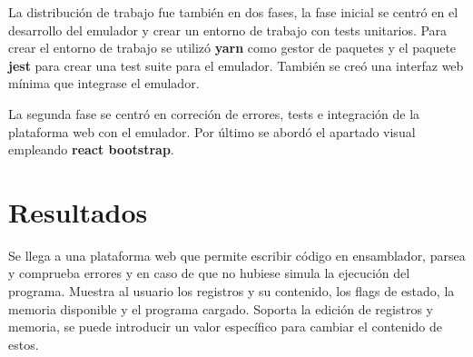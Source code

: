 {    La distribución de trabajo fue también en dos fases, la fase inicial se centró en el desarrollo del emulador y crear un entorno de trabajo con tests unitarios.
    Para crear el entorno de trabajo se utilizó \textbf{yarn} como gestor de paquetes y el paquete \textbf{jest} para crear una test suite para el emulador.
    También se creó una interfaz web mínima que integrase el emulador.

    La segunda fase se centró en correción de errores, tests e integración de la plataforma web con el emulador. 
    Por último se abordó el apartado visual empleando \textbf{react bootstrap}.
}

\section{Resultados}
    Se llega a una plataforma web que permite escribir código en ensamblador, parsea y comprueba errores y en caso de que no hubiese simula la ejecución del programa.
    Muestra al usuario los registros y su contenido, los flags de estado, la memoria disponible y el programa cargado.
    Soporta la edición de registros y memoria, se puede introducir un valor específico para cambiar el contenido de estos.

